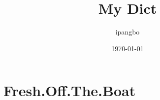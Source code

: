 \documentclass[11pt,a4paper]{ctexbook}
\title{{\Huge{\textbf{My Dict}}}}
\author{ipangbo}
\date{\today}
\begin{document}
\maketitle

\tableofcontents


\chapter{Fresh.Off.The.Boat}
\newpage



\end{document}
